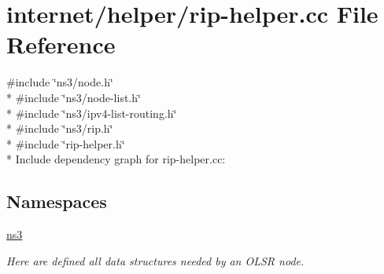 \hypertarget{rip-helper_8cc}{}\section{internet/helper/rip-\/helper.cc File Reference}
\label{rip-helper_8cc}
{\ttfamily \#include \char`\"{}ns3/node.\+h\char`\"{}}\\*
{\ttfamily \#include \char`\"{}ns3/node-\/list.\+h\char`\"{}}\\*
{\ttfamily \#include \char`\"{}ns3/ipv4-\/list-\/routing.\+h\char`\"{}}\\*
{\ttfamily \#include \char`\"{}ns3/rip.\+h\char`\"{}}\\*
{\ttfamily \#include \char`\"{}rip-\/helper.\+h\char`\"{}}\\*
Include dependency graph for rip-\/helper.cc\+:
\subsection*{Namespaces}
\begin{DoxyCompactItemize}
\item 
 \hyperlink{namespacens3}{ns3}
\begin{DoxyCompactList}\small\item\em Here are defined all data structures needed by an O\+L\+SR node. \end{DoxyCompactList}\end{DoxyCompactItemize}
